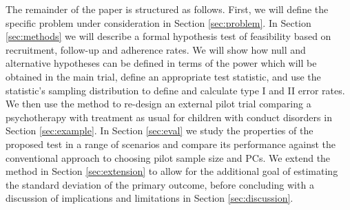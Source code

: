 \documentclass[AMA,STIX1COL]{WileyNJD-v2}
\begin{document}


The remainder of the paper is structured as follows. First, we will define the specific problem under consideration in Section \ref{sec:problem}. In Section \ref{sec:methods} we will describe a formal hypothesis test of feasibility based on recruitment, follow-up and adherence rates. We will show how null and alternative hypotheses can be defined in terms of the power which will be obtained in the main trial, define an appropriate test statistic, and use the statistic's sampling distribution to define and calculate type I and II error rates. We then use the method to re-design an external pilot trial comparing a psychotherapy with treatment as usual for children with conduct disorders in Section \ref{sec:example}. In Section \ref{sec:eval} we study the properties of the proposed test in a range of scenarios and compare its performance against the conventional approach to choosing pilot sample size and PCs. We extend the method in Section \ref{sec:extension} to allow for the additional goal of estimating the standard deviation of the primary outcome, before concluding with a discussion of implications and limitations in Section \ref{sec:discussion}.

\end{document}

